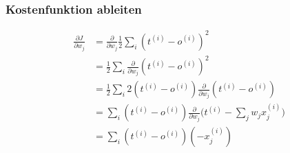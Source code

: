 \begin{frame}
\frametitle{Kostenfunktion ableiten}

\begin{align*}
\frac{\partial J}{\partial w_j} & = \frac{\partial }{\partial w_j} \frac{1}{2} \sum_i  (t^{(i)} - o^{(i)})^2 \\
 & = \frac{1}{2} \sum_i \frac{\partial }{\partial w_j} (t^{(i)} - o^{(i)})^2 \\
 & = \frac{1}{2} \sum_i 2 (t^{(i)} - o^{(i)}) \frac{\partial }{\partial w_j} (t^{(i)} - o^{(i)}) \\
 & = \sum_i (t^{(i)} - o^{(i)}) \frac{\partial }{\partial w_j} \bigg(t^{(i)} - \sum_j w_j x^{(i)}_{j}\bigg) \\
 & = \sum_i  (t^{(i)} - o^{(i)})(-x^{(i)}_{j})
\end{align*}




\end{frame}


